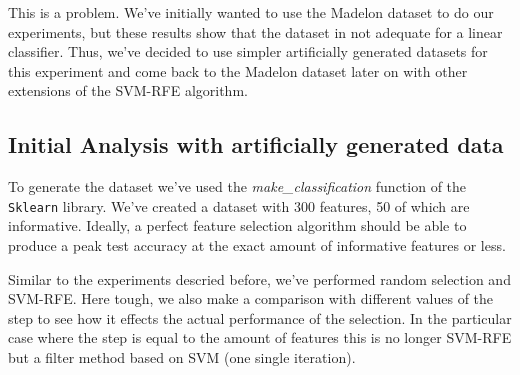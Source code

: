 This is a problem. We've initially wanted to use the Madelon dataset to do our experiments, but these results show that the dataset in not adequate for a linear classifier. Thus, we've decided to use simpler artificially generated datasets for this experiment and come back to the Madelon dataset later on with other extensions of the SVM-RFE algorithm.

\subsection{Initial Analysis with artificially generated data}

To generate the dataset we've used the \textit{make\_classification} function of the \texttt{Sklearn} library. We've created a dataset with 300 features, 50 of which are informative. Ideally, a perfect feature selection algorithm should be able to produce a peak test accuracy at the exact amount of informative features or less.

Similar to the experiments descried before, we've performed random selection and SVM-RFE. Here tough, we also make a comparison with different values of the step to see how it effects the actual performance of the selection. In the particular case where the step is equal to the amount of features this is no longer SVM-RFE but a filter method based on SVM (one single iteration).

